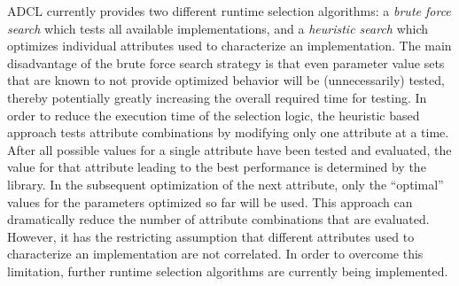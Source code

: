 ADCL currently provides two different runtime selection algorithms: a
{\it brute force search} which tests all available implementations,
and a {\it heuristic search} which optimizes individual attributes
used to characterize an implementation. The main disadvantage of the
brute force search strategy is that even parameter value sets that are
known to not provide optimized behavior will be (unnecessarily)
tested, thereby potentially greatly increasing the overall required
time for testing. In order to reduce the execution time of the selection
logic, the heuristic based approach tests attribute combinations by
modifying only one attribute at a time. After all possible values for
a single attribute have been tested and evaluated, the value for that
attribute leading to the best performance is determined by the
library. In the subsequent optimization of the next attribute, only
the ``optimal'' values for the parameters optimized so far will be
used. This approach can dramatically reduce the number of attribute
combinations that are evaluated. However, it has the restricting
assumption that different attributes used to characterize an
implementation are not correlated. In order to overcome this
limitation, further runtime selection algorithms are currently being
implemented.